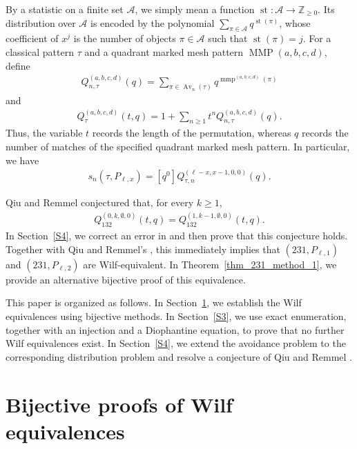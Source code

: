\documentclass[11pt]{article}
\begin{document}
By a statistic on a finite set $\mathcal A$, we simply mean a function
$\operatorname{st}:\mathcal A\to\mathbb{Z}_{\geq 0}$. Its distribution over
$\mathcal A$ is encoded by the polynomial $\sum_{\pi\in\mathcal A} q^{\operatorname{st}(\pi)}$, whose coefficient of $x^j$ is the number of objects $\pi\in\mathcal A$
such that $\operatorname{st}(\pi)=j$. 
For a classical pattern $\tau$ and a quadrant marked mesh pattern
$\operatorname{MMP}(a,b,c,d)$, define
\begin{align*}
Q_{n,\tau}^{(a,b,c,d)}(q)
=
\sum_{\pi\in\operatorname{Av}_n(\tau)}q^{\operatorname{mmp}^{(a,b,c,d)}(\pi)}
\end{align*}
and
\begin{align*}
Q_{\tau}^{(a,b,c,d)}(t,q)
=
1+\sum_{n\geq1}t^nQ_{n,\tau}^{(a,b,c,d)}(q).
\end{align*}
Thus, the variable $t$ records the length of the permutation, whereas
$q$ records the number of matches of the specified quadrant marked mesh
pattern. 
In particular, we have
\begin{align*}
  s_n(\tau,P_{\ell,x})
  =[q^0]Q_{\tau,n}^{(\ell-x,x-1,0,0)}(q).
\end{align*}

Qiu and Remmel \cite[Conjecture~1]{QiuRemmel2018} conjectured that, for every
$k\geq1$,
\begin{align*}
Q_{132}^{(0,k,\emptyset,0)}(t,q)
=
Q_{132}^{(1,k-1,\emptyset,0)}(t,q).
\end{align*}
In Section~\ref{S4}, we correct an error in \cite{QiuRemmel2018} and then
prove that this conjecture holds.
Together with Qiu and Remmel's \cite[Corollary~1]{QiuRemmel2018}, this
immediately implies that $(231,P_{\ell,1})$ and $(231,P_{\ell,2})$ are
Wilf-equivalent. In Theorem~\ref{thm_231_method_1}, we provide an alternative
bijective proof of this equivalence.

This paper is organized as follows.
In Section~\ref{S2}, we establish the Wilf equivalences using bijective methods.
In Section~\ref{S3}, we use exact enumeration, together with an injection and a Diophantine equation, to prove that no further Wilf equivalences exist.
In Section~\ref{S4}, we extend the avoidance problem to the corresponding distribution problem and resolve a conjecture of Qiu and Remmel \cite{QiuRemmel2018}.

\section{Bijective proofs of Wilf equivalences}\label{S2}
\end{document}
